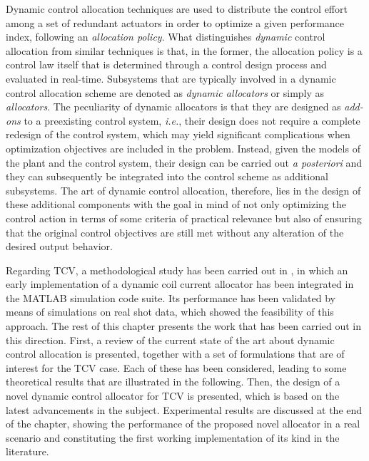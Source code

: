 Dynamic control allocation techniques are used to distribute the control effort among a set of redundant actuators in order to optimize a given performance index, following an \emph{allocation policy}. What distinguishes \emph{dynamic} control allocation from similar techniques is that, in the former, the allocation policy is a control law itself that is determined through a control design process and evaluated in real-time. Subsystems that are typically involved in a dynamic control allocation scheme are denoted as \emph{dynamic allocators} or simply as \emph{allocators}. The peculiarity of dynamic allocators is that they are designed as \emph{add-ons} to a preexisting control system, \emph{i.e.}, their design does not require a complete redesign of the control system, which may yield significant complications when optimization objectives are included in the problem. Instead, given the models of the plant and the control system, their design can be carried out \emph{a posteriori} and they can subsequently be integrated into the control scheme as additional subsystems. The art of dynamic control allocation, therefore, lies in the design of these additional components with the goal in mind of not only optimizing the control action in terms of some criteria of practical relevance but also of ensuring that the original control objectives are still met without any alteration of the desired output behavior.

Regarding TCV, a methodological study has been carried out in \cite{tenaglia_dynamic_2024}, in which an early implementation of a dynamic coil current allocator has been integrated in the MATLAB simulation code suite. Its performance has been validated by means of simulations on real shot data, which showed the feasibility of this approach. The rest of this chapter presents the work that has been carried out in this direction. First, a review of the current state of the art about dynamic control allocation is presented, together with a set of formulations that are of interest for the TCV case. Each of these has been considered, leading to some theoretical results that are illustrated in the following. Then, the design of a novel dynamic control allocator for TCV is presented, which is based on the latest advancements in the subject. Experimental results are discussed at the end of the chapter, showing the performance of the proposed novel allocator in a real scenario and constituting the first working implementation of its kind in the literature.
